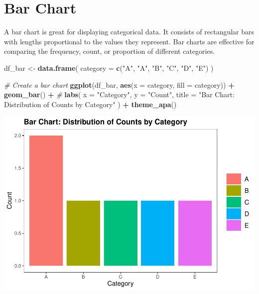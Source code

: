 \documentclass[
]{book}
\newenvironment{Shaded}{\begin{snugshade}}{\end{snugshade}}
\newcommand{\AttributeTok}[1]{\textcolor[rgb]{0.13,0.29,0.53}{#1}}
\newcommand{\CommentTok}[1]{\textcolor[rgb]{0.56,0.35,0.01}{\textit{#1}}}
\newcommand{\FunctionTok}[1]{\textcolor[rgb]{0.13,0.29,0.53}{\textbf{#1}}}
\newcommand{\NormalTok}[1]{#1}
\newcommand{\OtherTok}[1]{\textcolor[rgb]{0.56,0.35,0.01}{#1}}
\newcommand{\SpecialCharTok}[1]{\textcolor[rgb]{0.81,0.36,0.00}{\textbf{#1}}}
\newcommand{\StringTok}[1]{\textcolor[rgb]{0.31,0.60,0.02}{#1}}
\begin{document}
\hypertarget{bar-chart}{%
\section{Bar Chart}\label{bar-chart}}

A bar chart is great for displaying categorical data. It consists of rectangular bars with lengths proportional to the values they represent. Bar charts are effective for comparing the frequency, count, or proportion of different categories.

\begin{Shaded}
\begin{Highlighting}[]
\NormalTok{df\_bar }\OtherTok{\textless{}{-}} \FunctionTok{data.frame}\NormalTok{(}
  \AttributeTok{category =} \FunctionTok{c}\NormalTok{(}\StringTok{"A"}\NormalTok{, }\StringTok{"A"}\NormalTok{, }\StringTok{"B"}\NormalTok{, }\StringTok{"C"}\NormalTok{, }\StringTok{"D"}\NormalTok{, }\StringTok{"E"}\NormalTok{)}
\NormalTok{)}

\CommentTok{\# Create a bar chart}
\FunctionTok{ggplot}\NormalTok{(df\_bar, }\FunctionTok{aes}\NormalTok{(}\AttributeTok{x =}\NormalTok{ category, }\AttributeTok{fill =}\NormalTok{ category)) }\SpecialCharTok{+}
  \FunctionTok{geom\_bar}\NormalTok{() }\SpecialCharTok{+} \CommentTok{\#}
  \FunctionTok{labs}\NormalTok{(}
    \AttributeTok{x =} \StringTok{"Category"}\NormalTok{,}
    \AttributeTok{y =} \StringTok{"Count"}\NormalTok{,}
    \AttributeTok{title =} \StringTok{"Bar Chart: Distribution of Counts by Category"}
\NormalTok{  ) }\SpecialCharTok{+}
  \FunctionTok{theme\_apa}\NormalTok{()}
\end{Highlighting}
\end{Shaded}

\includegraphics{rintro_demo_files/figure-latex/unnamed-chunk-323-1.pdf}
\end{document}
